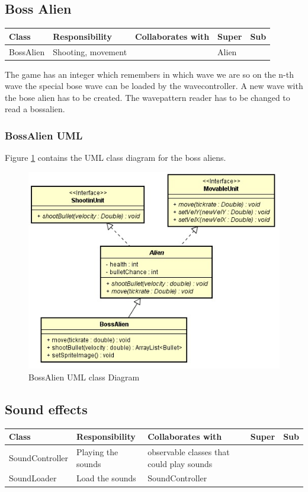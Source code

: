 \subsection{ Boss Alien}
\begin{center}
    \begin{tabular}{ | p{4.5cm} | p{3cm} | p{3cm} | p{3cm} | p{1cm} |}
  \hline
    Class & Responsibility & Collaborates with & Super & Sub \\ \hline
   BossAlien & Shooting, movement  &  & Alien & \\ \hline

    \end{tabular}
\end{center}
The game has an integer which remembers in which wave we are so on the n-th wave the special bose wave can be loaded by the wavecontroller. 
A new wave with the bose alien has to be created. The wavepattern reader has to be changed to read a bossalien.
\subsubsection{ BossAlien UML}
Figure \ref{fig:1-1bossAlien} contains the UML class diagram for the boss aliens.
\begin{figure}[ht!]
\centering
\includegraphics[width=12cm]{BossAlien.jpg}
\caption{BossAlien UML class Diagram}
\label{fig:1-1bossAlien}
\end{figure}
\newpage
\subsection{ Sound effects}
\begin{center}
    \begin{tabular}{ | p{4.5cm} | p{3cm} | p{3cm} | p{3cm} | p{1cm} |}
  \hline
    Class & Responsibility & Collaborates with & Super & Sub \\ \hline
   SoundController & Playing the sounds  & observable classes that could play sounds  &  & \\ \hline
   SoundLoader & Load the sounds  & SoundController  &  & \\ \hline

    \end{tabular}
\end{center}

